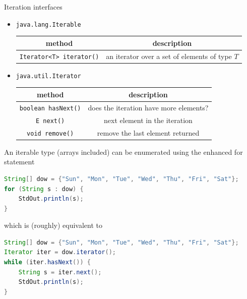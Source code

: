 \documentclass[8pt,a4paper,compress]{beamer}
\begin{document}
\begin{frame}[fragile]
\pause

Iteration interfaces 
\begin{itemize}
\item \lstinline{java.lang.Iterable}
\begin{center}
\begin{tabular}{cc}
method & description \\ \hline
\lstinline$Iterator<T> iterator()$ & an iterator over a set of elements of type $T$
\end{tabular} 
\end{center}

\item \lstinline{java.util.Iterator}
\begin{center}
\begin{tabular}{cc}
method & description \\ \hline
\lstinline$boolean hasNext()$ & does the iteration have more elements? \\
\lstinline$E next()$ & next element in the iteration \\
\lstinline$void remove()$ & remove the last element returned
\end{tabular} 
\end{center}
\end{itemize}

\pause
\bigskip

An iterable type (arrays included) can be enumerated using the enhanced for statement
\begin{lstlisting}[language=Java]
String[] dow = {"Sun", "Mon", "Tue", "Wed", "Thu", "Fri", "Sat"};
for (String s : dow) {
    StdOut.println(s);
}
\end{lstlisting}
which is (roughly) equivalent to
\begin{lstlisting}[language=Java]
String[] dow = {"Sun", "Mon", "Tue", "Wed", "Thu", "Fri", "Sat"};
Iterator iter = dow.iterator();
while (iter.hasNext()) {
    String s = iter.next();
    StdOut.println(s);
}
\end{lstlisting}
\end{frame}
\end{document}
